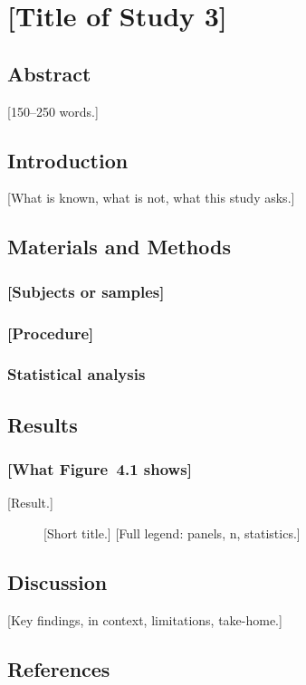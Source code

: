 \chapter{[Title of Study 3]}
\label{ch:study3}

\section{Abstract}
\label{sec:abstract_4}
[150–250 words.]

\section{Introduction}
\label{sec:intro_4}
[What is known, what is not, what this study asks.]

\section{Materials and Methods}
\label{sec:methods_4}
\subsection{[Subjects or samples]}
\subsection{[Procedure]}
\subsection{Statistical analysis}

\section{Results}
\label{sec:results_4}
\subsection{[What Figure~4.1 shows]}
[Result.]

\begin{figure}[tbp]
  \centering
  \caption{[Short title.] [Full legend: panels, n, statistics.]}
  \label{fig:study3-fig1}
\end{figure}

\section{Discussion}
\label{sec:discussion_4}
[Key findings, in context, limitations, take-home.]

\section{References}
\label{sec:ref_4}
